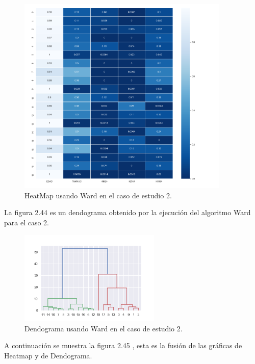 	\begin{figure}[htb]
		\centering
		\includegraphics[width=0.9\textwidth]{./imagenes/caso2/heatmap_caso2_Ward}
		\caption{HeatMap usando Ward en el caso de estudio 2.} \label{fig:1}
	\end{figure}


	La figura 2.44 es un dendograma obtenido por la ejecución del algoritmo Ward para
	el caso 2. \\

	\begin{figure}[htb]
		\centering
		\includegraphics[width=0.6\textwidth]{./imagenes/caso2/dendograma_caso2_Ward}
		\caption{Dendograma usando Ward en el caso de estudio 2.} \label{fig:1}
	\end{figure}

	A continuación se muestra la figura 2.45 , esta es la fusión de las gráficas de 
	Heatmap y de Dendograma.  \\

